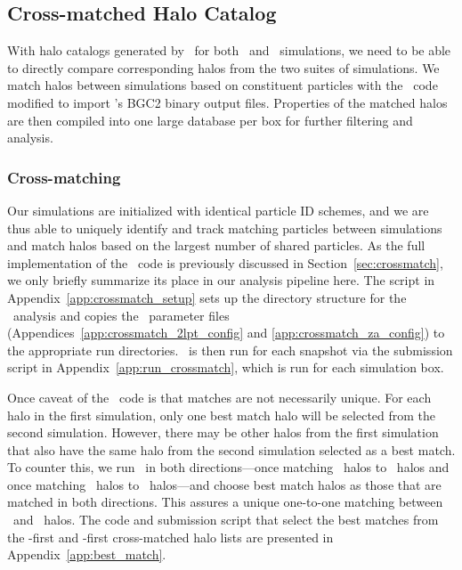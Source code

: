 \subsection{Cross-matched Halo Catalog}
\label{subsec:analysis--catalog}


With halo catalogs generated by \rockstar\ for both \lpt\ and \za\ simulations, we need to be able to directly compare corresponding halos from the two suites of simulations.  We match halos between simulations based on constituent particles with the \crossmatch\ code modified to import \rockstar's BGC2 binary output files.  Properties of the matched halos are then compiled into one large database per box for further filtering and analysis.



\subsubsection{Cross-matching}
\label{subsubsec:analysis--catalog--crossmatching}


Our simulations are initialized with identical particle ID schemes, and we are thus able to uniquely identify and track matching particles between simulations and match halos based on the largest number of shared particles.  As the full implementation of the \crossmatch\ code is previously discussed in Section~\ref{sec:crossmatch}, we only briefly summarize its place in our analysis pipeline here.  The script in Appendix~\ref{app:crossmatch_setup} sets up the directory structure for the \crossmatch\ analysis and copies the \crossmatch\ parameter files (Appendices~\ref{app:crossmatch_2lpt_config} and \ref{app:crossmatch_za_config}) to the appropriate run directories.  \crossmatch\ is then run for each snapshot via the submission script in Appendix~\ref{app:run_crossmatch}, which is run for each simulation box.

Once caveat of the \crossmatch\ code is that matches are not necessarily unique.  For each halo in the first simulation, only one best match halo will be selected from the second simulation.  However, there may be other halos from the first simulation that also have the same halo from the second simulation selected as a best match.  To counter this, we run \crossmatch\ in both directions---once matching \za\ halos to \lpt\ halos and once matching \lpt\ halos to \za\ halos---and choose best match halos as those that are matched in both directions.  This assures a unique one-to-one matching between \lpt\ and \za\ halos.  The code and submission script that select the best matches from the \lpt-first and \za-first cross-matched halo lists are presented in Appendix~\ref{app:best_match}.



